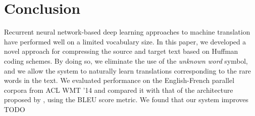 \section{Conclusion}
\label{sec:conclusion}

Recurrent neural network-based deep learning approaches
to machine translation have performed well on a limited vocabulary
size. In this paper, we developed a novel approach for compressing
the source and target text based on Huffman coding schemes. By doing
so, we eliminate the use of the \emph{unknown word} symbol,
and we allow the system to naturally learn translations corresponding
to the rare words in the text. We evaluated performance on the English-French
parallel corpora from ACL WMT '14 and compared it with that of the architecture
proposed by , using the BLEU score metric.
We found that our system improves TODO